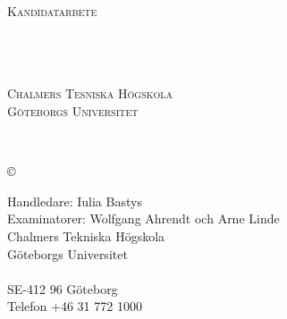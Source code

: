 \newpage
\thispagestyle{empty}
\begin{center}

    \textsc{\large Kandidatarbete \the\year }\\[4cm]

    \textbf{\Large \ambaTitle} \\[1cm]

    {\linespread{1.2}\large
    \StrSubstitute{\ambaAuthors}{,}{\\}
    \\ %
    }

    \vfill

    \ambaDepartmentSwedish \\
    \textsc{Chalmers Tesniska Högskola} \\
    \textsc{Göteborgs Universitet} \\
    \ambaCityCountryYearSwedish
\end{center}


\newpage
{\ambaTitle}\\
\textsc{\ambaAuthors}
\setlength{\parskip}{0.5cm}

\copyright{~\textsc{\ambaAuthors \the\year}}
\setlength{\parskip}{1cm}

Handledare: Iulia Bastys \\
Examinatorer: Wolfgang Ahrendt och Arne Linde \\[1cm]

Chalmers Tekniska Högskola\\
Göteborgs Universitet\\
\ambaDepartmentSwedish \\
SE-412 96 Göteborg\\
Telefon +46 31 772 1000 \setlength{\parskip}{0.5cm}

\vfill
\ambaCityCountryYearSwedish
